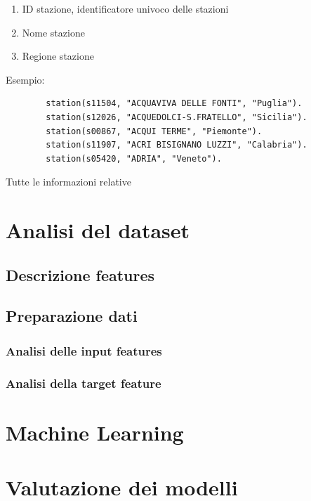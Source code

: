 \documentclass[italian,12pt,a4paper]{article}
\begin{document}
			\begin{enumerate}
				\item ID stazione, identificatore univoco delle stazioni
				\item Nome stazione
				\item Regione stazione
			\end{enumerate}
		Esempio:

\begin{small}
	
	\begin{verbatim}
		station(s11504, "ACQUAVIVA DELLE FONTI", "Puglia").
		station(s12026, "ACQUEDOLCI-S.FRATELLO", "Sicilia").
		station(s00867, "ACQUI TERME", "Piemonte").
		station(s11907, "ACRI BISIGNANO LUZZI", "Calabria").
		station(s05420, "ADRIA", "Veneto").
	\end{verbatim}
\end{small}
	
	Tutte le informazioni relative


	\section{Analisi del dataset}
	
	\subsection{Descrizione features}

	
	\subsection{Preparazione dati}
	
	\subsubsection{Analisi delle input features}

	
	\subsubsection{Analisi della target feature}

	
	\section{Machine Learning}
	
	\section{Valutazione dei modelli}
\end{document}
